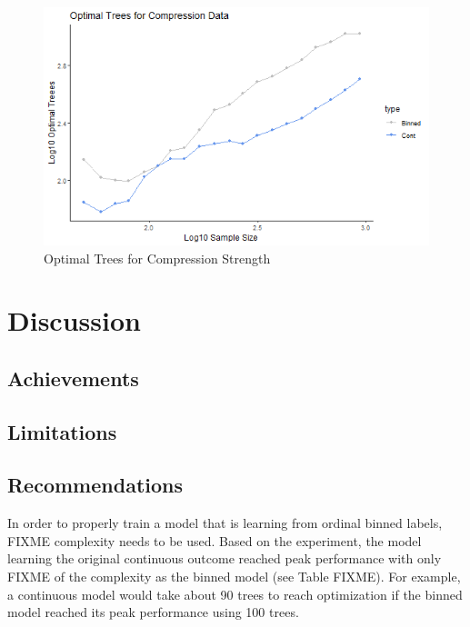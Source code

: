 \documentclass[10pt]{article}\usepackage[]{graphicx}\usepackage[]{xcolor}
\begin{document}
\begin{figure}[htp]
  \centering
  \includegraphics[scale=0.8]{effects_of_sample_size/corrected_concrete_optimal_trees.png}
  \caption{Optimal Trees for Compression Strength}
  \label{img:concrete_samp}
\end{figure}


\newpage











\section{Discussion}
\subsection{Achievements}


\subsection{Limitations}


\subsection{Recommendations}
In order to properly train a model that is learning from ordinal binned labels, FIXME complexity needs to be used. Based on the experiment, the model learning the original continuous outcome reached peak performance with only FIXME of the complexity as the binned model (see Table FIXME). For example, a continuous model would take about 90 trees to reach optimization if the binned model reached its peak performance using 100 trees.
\end{document}
